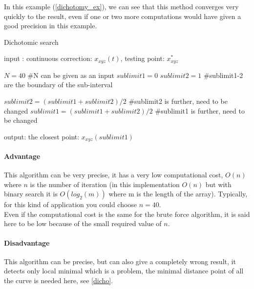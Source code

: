 In this example (\autoref{dichotomy_ex}), we can see that this method converges very quickly to the result, even if one or two more computations would have given a good precision in this example.

\begin{algorithm}[H]
  \caption{Dichotomic search}
  \label{dy_algo}
  \begin{algorithmic}

      \STATE input : continuous correction: $x_{xyz}(t)$, testing point: $x_{xyz}^*$
      \STATE

      \STATE $N = 40$ \#N can be given as an input
      \STATE $sublimit1 = 0$
      \STATE $sublimit2 = 1$ \#sublimit1-2 are the boundary of the sub-interval
      \STATE

                \STATE $sublimit2 = (sublimit1+sublimit2)/2$ \#sublimit2 is further, need to be changed
            \ELSE
                \STATE $sublimit1 = (sublimit1+sublimit2)/2$ \#sublimit1 is further, need to be changed
            \ENDIF
        \ENDFOR

        \STATE
        \STATE output: the closest point: $x_{xyz}(sublimit1)$

    \end{algorithmic}
\end{algorithm}

\paragraph*{Advantage}

This algorithm can be very precise, it has a very low computational cost, $ O(n) $ where $n$ is the number of iteration (in this implementation $ O(n) $ but with binary search it is $ O(log_2(m)) $ where m is the length of the array). Typically, for this kind of application you could choose $ n = 40 $.\\
Even if the computational cost is the same for the brute force algorithm, it is said here to be low because of the small required value of $n$.

\paragraph*{Disadvantage}

This algorithm can be precise, but can also give a completely wrong result, it detects only local minimal which is a problem, the minimal distance point of all the curve is needed here, see \autoref{dicho}.

